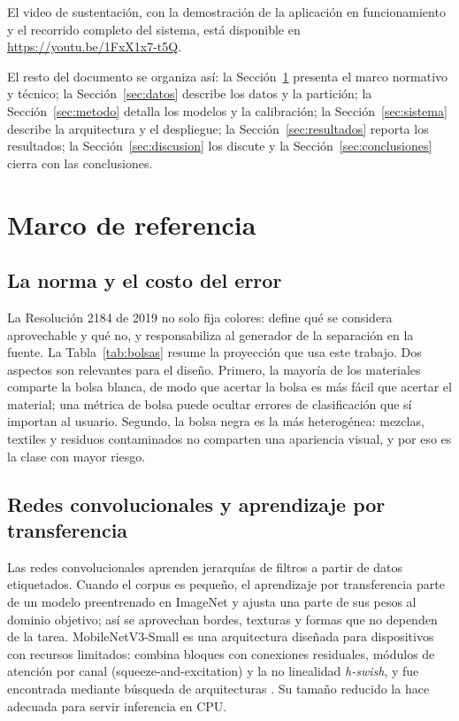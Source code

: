 \documentclass[10pt]{ieeeconf}
\begin{document}
El video de sustentaci\'on, con la demostraci\'on de la aplicaci\'on en
funcionamiento y el recorrido completo del sistema, est\'a disponible en
\url{https://youtu.be/1FxX1x7-t5Q}.

El resto del documento se organiza as\'i: la Secci\'on~\ref{sec:marco} presenta
el marco normativo y t\'ecnico; la Secci\'on~\ref{sec:datos} describe los datos y
la partici\'on; la Secci\'on~\ref{sec:metodo} detalla los modelos y la
calibraci\'on; la Secci\'on~\ref{sec:sistema} describe la arquitectura y el
despliegue; la Secci\'on~\ref{sec:resultados} reporta los resultados; la
Secci\'on~\ref{sec:discusion} los discute y la Secci\'on~\ref{sec:conclusiones}
cierra con las conclusiones.

\section{Marco de referencia}
\label{sec:marco}

\subsection{La norma y el costo del error}

La Resoluci\'on 2184 de 2019 no solo fija colores: define qu\'e se considera
aprovechable y qu\'e no, y responsabiliza al generador de la separaci\'on en la
fuente. La Tabla~\ref{tab:bolsas} resume la proyecci\'on que usa este trabajo. Dos
aspectos son relevantes para el dise\~no. Primero, la mayor\'ia de los materiales
comparte la bolsa blanca, de modo que acertar la bolsa es m\'as f\'acil que
acertar el material; una m\'etrica de bolsa puede ocultar errores de
clasificaci\'on que s\'i importan al usuario. Segundo, la bolsa negra es la m\'as
heterog\'enea: mezclas, textiles y residuos contaminados no comparten una
apariencia visual, y por eso es la clase con mayor riesgo.

\subsection{Redes convolucionales y aprendizaje por transferencia}

Las redes convolucionales aprenden jerarqu\'ias de filtros a partir de datos
etiquetados. Cuando el corpus es peque\~no, el aprendizaje por transferencia parte
de un modelo preentrenado en ImageNet y ajusta una parte de sus pesos al dominio
objetivo; as\'i se aprovechan bordes, texturas y formas que no dependen de la
tarea. MobileNetV3-Small es una arquitectura dise\~nada para dispositivos con
recursos limitados: combina bloques con conexiones residuales, m\'odulos de
atenci\'on por canal (squeeze-and-excitation) y la no linealidad \textit{h-swish},
y fue encontrada mediante b\'usqueda de arquitecturas \cite{howard2019mobilenetv3}.
Su tama\~no reducido la hace adecuada para servir inferencia en CPU.
\end{document}
